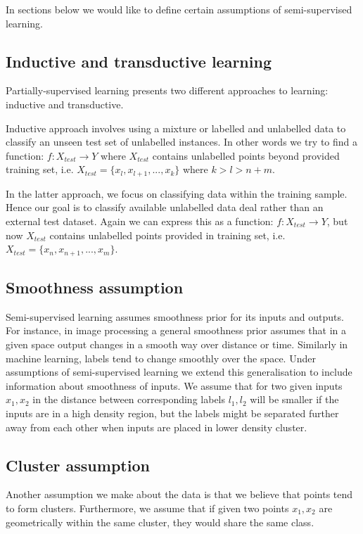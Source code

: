 \documentclass[12pt, a4paper, pdflatex]{report}
\begin{document}
In sections below we would like to define certain assumptions of semi-supervised learning.

\subsection{Inductive and transductive learning}
Partially-supervised learning presents two different approaches to learning: inductive and transductive\cite{chapelle06}. 

Inductive approach involves using a mixture or labelled and unlabelled data to classify an unseen test set of unlabelled instances. In other words we try to find a function: $ f: X_{test} \to Y $ where $ X_{test} $ contains unlabelled points beyond provided training set, i.e. $ X_{test} = \{ x_l, x_{l+1}, ..., x_{k} \} $ where $ k > l > n+m $.

In the latter approach, we focus on classifying data within the training sample. Hence our goal is to classify available unlabelled data deal rather than an external test dataset. Again we can express this as a function: $ f: X_{test} \to Y $, but now $ X_{test} $ contains unlabelled points provided in training set, i.e. $ X_{test} = \{ x_n, x_{n+1}, ..., x_{m} \} $.



\subsection{Smoothness assumption}

Semi-supervised learning assumes smoothness prior for its inputs and outputs\cite{chapelle06}. For instance, in image processing a general smoothness prior assumes that in a given space output changes in a smooth way over distance or time\cite{stan95}. Similarly in machine learning, labels tend to change smoothly over the space. Under assumptions of semi-supervised learning we extend this generalisation to include information about smoothness of inputs. We assume that for two given inputs $ x_1, x_2 $ in the distance between corresponding labels $ l_1, l_2 $ will be smaller if the inputs are in a high density region, but the labels might be separated further away from each other when inputs are placed in lower density cluster.

\subsection{Cluster assumption}

Another assumption we make about the data is that we believe that points tend to form clusters. Furthermore, we assume that if given two points $ x_1, x_2 $ are geometrically within the same cluster, they would share the same class\cite{chapelle06}.
\end{document}

